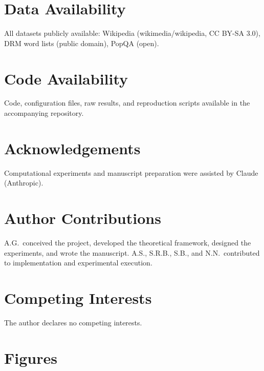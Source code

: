 \documentclass[11pt]{article}
\begin{document}
\section*{Data Availability}
All datasets publicly available: Wikipedia (wikimedia/wikipedia, CC BY-SA 3.0), DRM word lists (public domain\cite{roediger1995}), PopQA\cite{popqa} (open).

\section*{Code Availability}
Code, configuration files, raw results, and reproduction scripts available in the accompanying repository.

\section*{Acknowledgements}
Computational experiments and manuscript preparation were assisted by Claude (Anthropic).

\section*{Author Contributions}
A.G.\ conceived the project, developed the theoretical framework, designed the experiments, and wrote the manuscript. A.S., S.R.B., S.B., and N.N.\ contributed to implementation and experimental execution.

\section*{Competing Interests}
The author declares no competing interests.




\clearpage
\section*{Figures}
\end{document}
